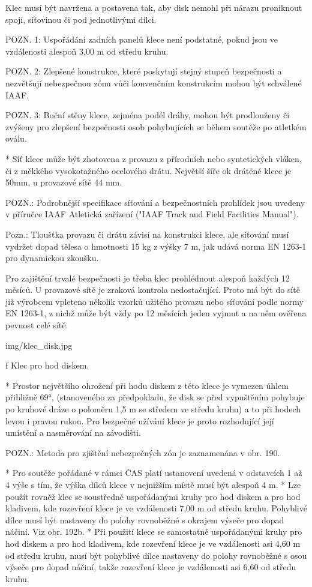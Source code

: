Klec musí být navržena a postavena tak, aby disk nemohl při nárazu proniknout spoji, síťovinou či pod jednotlivými dílci.

POZN. 1:  Uspořádání zadních panelů klece není podstatné, pokud jsou ve vzdálenosti alespoň 3,00 m od středu kruhu.

POZN. 2: Zlepšené konstrukce, které poskytují stejný stupeň bezpečnosti a nezvětšují nebezpečnou zónu vůči konvenčním konstrukcím mohou být schválené IAAF.

POZN. 3: Boční stěny klece, zejména podél dráhy, mohou být prodlouženy či zvýšeny pro zlepšení bezpečnosti osob pohybujících se během soutěže po atletkém oválu.

* Síť klece může být zhotovena z provazu z přírodních nebo syntetických vláken, či z měkkého vysokotažného ocelového drátu. Největší šíře ok drátěné klece je 50mm, u provazové sítě 44 mm.

POZN.: Podrobnější specifikace síťování a bezpečnostních prohlídek jsou uvedeny v příručce IAAF Atletická zařízení ("IAAF Track and Field Facilities Manual").

Pozn.: Tloušťka provazu či drátu závisí na konstrukci klece, ale síťování musí vydržet dopad tělesa o hmotnosti 15 kg z výšky 7 m, jak udává norma EN 1263-1 pro dynamickou zkoušku.

Pro zajištění trvalé bezpečnosti je třeba klec prohlédnout alespoň každých 12 měsíců. U provazové sítě je zraková kontrola nedostačující. Proto má být do sítě již výrobcem vpleteno několik vzorků užitého provazu nebo síťování podle normy EN 1263-1, z nichž může být vždy po 12 měsících jeden vyjmut a na něm ověřena pevnost celé sítě.

\picw=6cm \inspic img/klec_disk.jpg
\caption/f Klec pro hod diskem.

* Prostor největšího ohrožení při hodu diskem z této klece je vymezen úhlem přibližně 69°, (stanoveného za předpokladu, že disk se před vypuštěním pohybuje po kruhové dráze o poloměru 1,5 m se středem ve středu kruhu) a to při hodech levou i pravou rukou. Pro bezpečné užívání klece je proto rozhodující její umístění a nasměrování na závodišti.

POZN.: Metoda pro zjištění nebezpečných zón je zaznamenána v obr. 190.

* Pro soutěže pořádané v rámci ČAS platí ustanovení uvedená v odstavcích 1 až 4 výše s tím, že výška dílců klece v nejnižším místě musí být alespoň 4 m.
* Lze použít rovněž klec se soustředně uspořádanými kruhy pro hod diskem a pro hod kladivem, kde rozevření klece je ve vzdálenosti 7,00 m od středu kruhu. Pohyblivé dílce musí být nastaveny do polohy rovnoběžné s okrajem výseče pro dopad náčiní. Viz obr. 192b.
* Při použití klece se samostatně uspořádanými kruhy pro hod diskem a pro hod kladivem, kde rozevření klece je ve vzdálenosti asi 4,60 m od středu kruhu, musí být pohyblivé dílce nastaveny do polohy rovnoběžné s osou výseče pro dopad náčiní, takže rozevření klece je vzdálenosti asi 6,60 od středu kruhu.
\enditems

